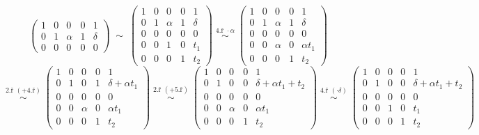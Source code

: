 \documentclass[12pt]{article}
\begin{document}
\begin{enumerate}
\[      \left(\begin{array}{cccc|c}
      1 & 0 & 0 & 0 & 1 \\
      0 & 1 & \alpha & 1 & \delta \\
      0 & 0 & 0 & 0 & 0
      \end{array}\right)
      \;\sim\;
      \left(\begin{array}{cccc|c}
      1 & 0 & 0 & 0 & 1 \\
      0 & 1 & \alpha & 1 & \delta \\
      0 & 0 & 0 & 0 & 0 \\ \hline
      0 & 0 & 1 & 0 & t_1 \\
      0 & 0 & 0 & 1 & t_2
      \end{array}\right)
      \overset{\text{4.ř } \cdot \alpha}{\;\sim\;}
      \left(\begin{array}{cccc|c}
      1 & 0 & 0 & 0 & 1 \\
      0 & 1 & \alpha & 1 & \delta \\
      0 & 0 & 0 & 0 & 0 \\ \hline
      0 & 0 & \alpha & 0 & \alpha t_1 \\
      0 & 0 & 0 & 1 & t_2
      \end{array}\right)
    \]
    \[
      \overset{\text{2.ř } (+\text{4.ř})}{\;\sim\;}
      \left(\begin{array}{cccc|c}
      1 & 0 & 0 & 0 & 1 \\
      0 & 1 & 0 & 1 & \delta + \alpha t_1 \\
      0 & 0 & 0 & 0 & 0 \\ \hline
      0 & 0 & \alpha & 0 & \alpha t_1 \\
      0 & 0 & 0 & 1 & t_2
      \end{array}\right)
      \overset{\text{2.ř } (+\text{5.ř})}{\;\sim\;}
      \left(\begin{array}{cccc|c}
      1 & 0 & 0 & 0 & 1 \\
      0 & 1 & 0 & 0 & \delta + \alpha t_1 + t_2 \\
      0 & 0 & 0 & 0 & 0 \\ \hline
      0 & 0 & \alpha & 0 & \alpha t_1 \\
      0 & 0 & 0 & 1 & t_2
      \end{array}\right)
      \overset{\text{4.ř } (\cdot \delta)}{\;\sim\;}
      \left(\begin{array}{cccc|c}
      1 & 0 & 0 & 0 & 1 \\
      0 & 1 & 0 & 0 & \delta + \alpha t_1 + t_2 \\
      0 & 0 & 0 & 0 & 0 \\ \hline
      0 & 0 & 1 & 0 & t_1 \\
      0 & 0 & 0 & 1 & t_2
      \end{array}\right)
    \]


\end{enumerate}
\end{document}
